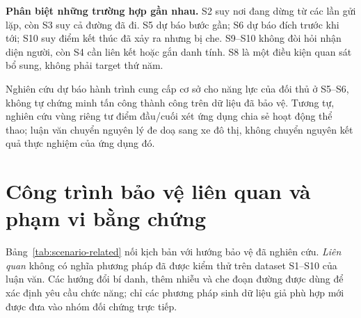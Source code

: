\documentclass[12pt,a4paper,oneside]{report}
\begin{document}
\noindent\textbf{Phân biệt những trường hợp gần nhau.}
S2 suy nơi đang dừng từ các lần gửi lặp, còn S3 suy cả đường đã đi. S5 dự báo bước gần; S6 dự báo đích trước khi tới; S10 suy điểm kết thúc đã xảy ra nhưng bị che. S9--S10 không đòi hỏi nhận diện người, còn S4 cần liên kết hoặc gắn danh tính. S8 là một điều kiện quan sát bổ sung, không phải target thứ năm.

Nghiên cứu dự báo hành trình cung cấp cơ sở cho năng lực của đối thủ ở S5--S6, không tự chứng minh tấn công thành công trên dữ liệu đã bảo vệ. Tương tự, nghiên cứu vùng riêng tư điểm đầu/cuối xét ứng dụng chia sẻ hoạt động thể thao; luận văn chuyển nguyên lý đe doạ sang xe đô thị, không chuyển nguyên kết quả thực nghiệm của ứng dụng đó.

\clearpage
\section{Công trình bảo vệ liên quan và phạm vi bằng chứng}
\label{sec:scenario-related}

Bảng~\ref{tab:scenario-related} nối kịch bản với hướng bảo vệ đã nghiên cứu. \emph{Liên quan} không có nghĩa phương pháp đã được kiểm thử trên dataset S1--S10 của luận văn. Các hướng đổi bí danh, thêm nhiễu và che đoạn đường được dùng để xác định yêu cầu chức năng; chỉ các phương pháp sinh dữ liệu giả phù hợp mới được đưa vào nhóm đối chứng trực tiếp.
\end{document}

